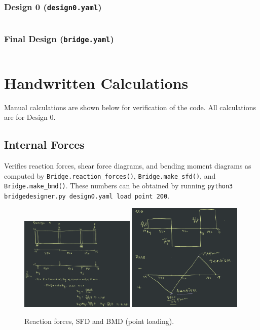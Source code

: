 \documentclass{article}
\begin{document}
\subsubsection{Design 0 (\texttt{design0.yaml})}
\label{sec:design0}

\inputminted[linenos, breaklines, fontsize=\small]{yaml}{../../design0.yaml}
\pagebreak

\subsubsection{Final Design (\texttt{bridge.yaml})}
\label{sec:design}

\inputminted[linenos, breaklines, fontsize=\small]{yaml}{../../new.yaml}
\pagebreak

\section{Handwritten Calculations}

Manual calculations are shown below for verification of the code. All calculations are for Design 0.

\subsection{Internal Forces}

Verifies reaction forces, shear force diagrams, and bending moment diagrams as computed by
\texttt{Bridge.reaction_forces()}, \texttt{Bridge.make_sfd()}, and
\texttt{Bridge.make_bmd()}. These numbers can be obtained by running
\texttt{python3 bridgedesigner.py design0.yaml load point 200}.

\begin{figure}[h]
    \centering
    \includegraphics[width=0.49\textwidth]{forces.png}
    \includegraphics[width=0.49\textwidth]{sfd_bmd.png}
    \caption{Reaction forces, SFD and BMD (point loading).}
\end{figure}
\end{document}
